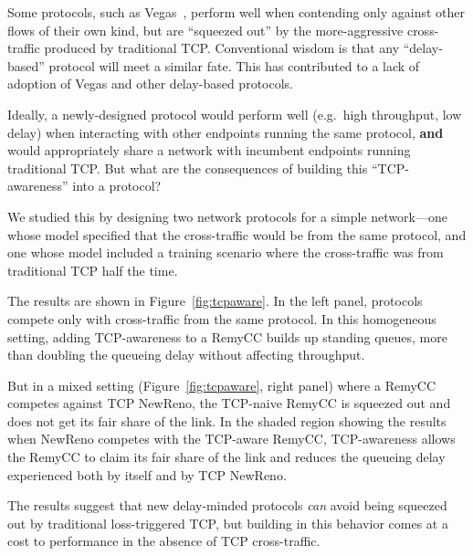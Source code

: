 Some protocols, such as Vegas~\cite{vegas}, perform well when
contending only against other flows of their own kind, but are
``squeezed out'' by the more-aggressive cross-traffic produced by
traditional TCP. Conventional wisdom is that any ``delay-based''
protocol will meet a similar fate. This has contributed to a lack of
adoption of Vegas and other delay-based protocols.

Ideally, a newly-designed protocol would perform well (e.g.~high
throughput, low delay) when interacting with other endpoints running
the same protocol, \textbf{and} would appropriately share a network
with incumbent endpoints running traditional TCP. But what are the
consequences of building this ``TCP-awareness'' into a protocol?

We studied this by designing two network protocols for a simple
network---one whose model specified that the cross-traffic would be
from the same protocol, and one whose model included a training
scenario where the cross-traffic was from traditional TCP half the
time.

The results are shown in Figure~\ref{fig:tcpaware}. In the left panel,
protocols compete only with cross-traffic from the same protocol. In
this homogeneous setting, adding TCP-awareness to a RemyCC builds
up standing queues, more than doubling the queueing delay without
affecting throughput.

But in a mixed setting (Figure~\ref{fig:tcpaware}, right panel) where a RemyCC competes against TCP
NewReno, the TCP-naive RemyCC is squeezed out and does not get its fair
share of the link. In the shaded region showing the results when
NewReno competes with the TCP-aware RemyCC, TCP-awareness allows the RemyCC
to claim its fair share of the link and reduces the queueing delay
experienced both by itself and by TCP NewReno.

The results suggest that new delay-minded protocols \emph{can} avoid
being squeezed out by traditional loss-triggered TCP, but building in
this behavior comes at a cost to performance in the absence of TCP
cross-traffic.

